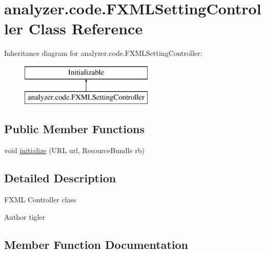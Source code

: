 \hypertarget{classanalyzer_1_1code_1_1FXMLSettingController}{}\section{analyzer.\+code.\+F\+X\+M\+L\+Setting\+Controller Class Reference}
\label{classanalyzer_1_1code_1_1FXMLSettingController}
Inheritance diagram for analyzer.\+code.\+F\+X\+M\+L\+Setting\+Controller\+:\begin{figure}[H]
\begin{center}
\leavevmode
\includegraphics[height=2.000000cm]{classanalyzer_1_1code_1_1FXMLSettingController}
\end{center}
\end{figure}
\subsection*{Public Member Functions}
\begin{DoxyCompactItemize}
\item 
void \hyperlink{classanalyzer_1_1code_1_1FXMLSettingController_acaccf0fd8287b68a3845acbbe31efe95}{initialize} (U\+RL url, Resource\+Bundle rb)
\end{DoxyCompactItemize}


\subsection{Detailed Description}
F\+X\+ML Controller class

\begin{DoxyAuthor}{Author}
tigler 
\end{DoxyAuthor}


\subsection{Member Function Documentation}
\mbox{\label{classanalyzer_1_1code_1_1FXMLSettingController_acaccf0fd8287b68a3845acbbe31efe95}} 
